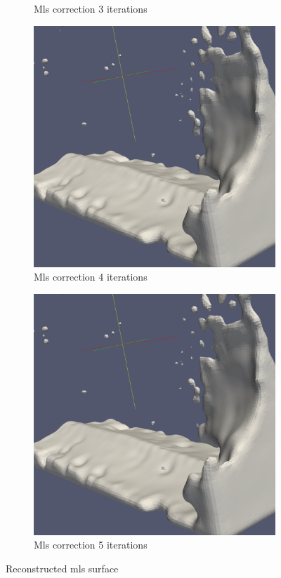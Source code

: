 \begin{figure}
\begin{center}
\begin{subfigure}[b]{0.47\textwidth}
			\caption{Mls correction 3 iterations}
		\end{subfigure}
		\begin{subfigure}[b]{0.47\textwidth}
			\includegraphics[width=\textwidth]{figures/MlsSurface4Iteration.png}
			\caption{Mls correction 4 iterations}
		\end{subfigure}
		\begin{subfigure}[b]{0.47\textwidth}
			\includegraphics[width=\textwidth]{figures/MlsSurface5Iteration.png}
			\caption{Mls correction 5 iterations}
		\end{subfigure}
	\end{center}
	\caption{Reconstructed mls surface} \label{fig:mls_surf_iter_examples}
\end{figure}
